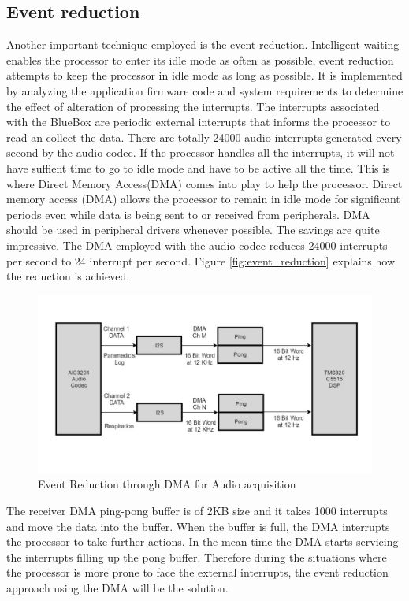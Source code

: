 \subsection{Event reduction}
Another important technique employed is the event reduction. Intelligent waiting enables the processor to enter its idle mode as often as possible, event reduction attempts to keep the processor in idle mode as long as possible. It is implemented by analyzing the application firmware code and system requirements to determine the effect of alteration of processing the 
interrupts. 
The interrupts associated with the BlueBox are periodic external interrupts that informs the processor to read an collect the data. There are totally 24000 audio interrupts generated every second by the audio codec. If the processor handles all the interrupts, it will not have suffient time to go to idle mode and have to be active all the time. This is where Direct Memory Access(DMA) comes into play to help the processor. Direct memory access (DMA) allows the processor to remain in idle mode for significant periods even while data is being sent to 
or received from peripherals. DMA should be used in peripheral drivers whenever possible. The savings are quite impressive. The DMA employed with the audio codec reduces 24000 interrupts per second to 24 interrupt per second. Figure \ref{fig:event_reduction} explains how the reduction is achieved.
 \begin{figure}[h]
	\centering
	\includegraphics[scale = 0.5 ]{Event_Reduction.JPG}
	\caption{Event Reduction through DMA for Audio acquisition\label{event_reduction}}
\end{figure}


The receiver DMA ping-pong buffer is of 2KB size and it takes 1000 interrupts and move the data into the buffer. When the buffer is full, the DMA interrupts the processor to take further actions. In the mean time the DMA starts servicing the interrupts filling up the pong buffer. Therefore during the situations where the processor is more prone to face the external interrupts, the event reduction approach using the DMA will be the solution.

